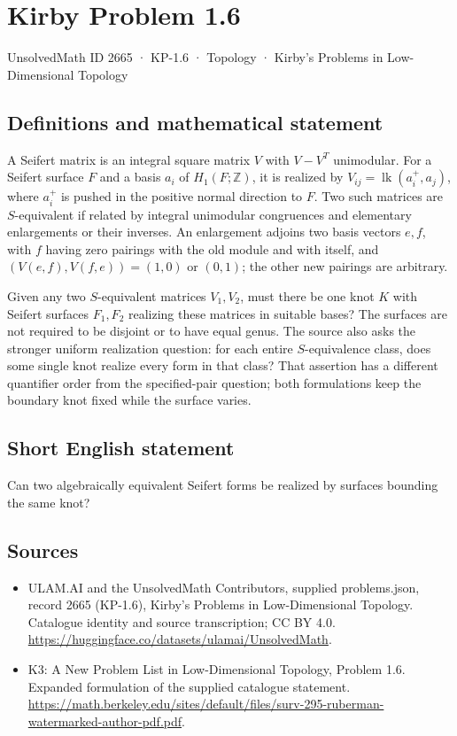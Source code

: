 \documentclass[11pt,a4paper]{article}
\begin{document}
\section*{Kirby Problem 1.6}\label{2665}
{\small UnsolvedMath ID 2665 · KP-1.6 · Topology · Kirby's Problems in Low-Dimensional Topology}
\subsection{Definitions and mathematical statement}
A Seifert matrix is an integral square matrix $V$ with $V-V^T$ unimodular. For a
Seifert surface $F$ and a basis $a_i$ of $H_1(F;\mathbb Z)$, it is realized by
$V_{ij}=\operatorname{lk}(a_i^+,a_j)$, where $a_i^+$ is pushed in the positive
normal direction to $F$.
Two such matrices are $S$-equivalent if related by integral unimodular congruences
and elementary enlargements or their inverses. An enlargement adjoins two basis
vectors $e,f$, with $f$ having zero pairings with the old module and with itself,
and $(V(e,f),V(f,e))=(1,0)$ or $(0,1)$; the other new pairings are arbitrary.

Given any two $S$-equivalent matrices $V_1,V_2$, must there be one knot $K$ with
Seifert surfaces $F_1,F_2$ realizing these matrices in suitable bases? The surfaces
are not required to be disjoint or to have equal genus.
The source also asks the stronger uniform realization question: for each entire
$S$-equivalence class, does some single knot realize every form in that class?
That assertion has a different quantifier order from the specified-pair question;
both formulations keep the boundary knot fixed while the surface varies.
\subsection{Short English statement}
Can two algebraically equivalent Seifert forms be realized by surfaces bounding the same knot?
\subsection{Sources}
\begin{itemize}
\item[S1] ULAM.AI and the UnsolvedMath Contributors, supplied problems.json, record 2665 (KP-1.6), Kirby's Problems in Low-Dimensional Topology. Catalogue identity and source transcription; CC BY 4.0.
\url{https://huggingface.co/datasets/ulamai/UnsolvedMath}.
\item[S2] K3: A New Problem List in Low-Dimensional Topology, Problem 1.6. Expanded formulation of the supplied catalogue statement.
\url{https://math.berkeley.edu/sites/default/files/surv-295-ruberman-watermarked-author-pdf.pdf}.
\end{itemize}
\end{document}
